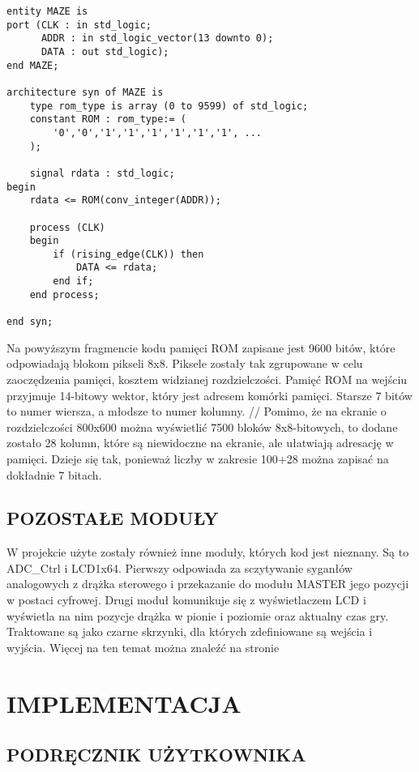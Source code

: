 \documentclass[11pt]{article}
\begin{document}
\begin{lstlisting}
entity MAZE is
port (CLK : in std_logic;
      ADDR : in std_logic_vector(13 downto 0);
      DATA : out std_logic);
end MAZE;

architecture syn of MAZE is
    type rom_type is array (0 to 9599) of std_logic;
    constant ROM : rom_type:= (
        '0','0','1','1','1','1','1','1', ...
    );

    signal rdata : std_logic;
begin
    rdata <= ROM(conv_integer(ADDR));

    process (CLK)
    begin
        if (rising_edge(CLK)) then
            DATA <= rdata;
        end if;
    end process;

end syn;
\end{lstlisting}

Na powyższym fragmencie kodu pamięci ROM zapisane jest 9600 bitów, które odpowiadają blokom pikseli 8x8.
Piksele zostały tak zgrupowane w celu zaoczędzenia pamięci, kosztem widzianej rozdzielczości.
Pamięć ROM na wejściu przyjmuje 14-bitowy wektor, który jest adresem komórki pamięci.
Starsze 7 bitów to numer wiersza, a młodsze to numer kolumny.
//
Pomimo, że na ekranie o rozdzielczości 800x600 można wyświetlić 7500 bloków 8x8-bitowych, to dodane zostało 28 kolumn, które są niewidoczne na ekranie, ale ułatwiają adresację w pamięci.
Dzieje się tak, ponieważ liczby w zakresie 100+28 można zapisać na dokładnie 7 bitach.

\subsection{POZOSTAŁE MODUŁY}

W projekcie użyte zostały również inne moduły, których kod jest nieznany.
Są to ADC\_Ctrl i LCD1x64.
Pierwszy odpowiada za sczytywanie syganłów analogowych z drążka sterowego i przekazanie do modułu MASTER jego pozycji w postaci cyfrowej.
Drugi moduł komunikuje się z wyświetlaczem LCD i wyświetla na nim pozycje drążka w pionie i poziomie oraz aktualny czas gry.
Traktowane są jako czarne skrzynki, dla których zdefiniowane są wejścia i wyjścia.
Więcej na ten temat można znaleźć na stronie 


\section{IMPLEMENTACJA}

\subsection{PODRĘCZNIK UŻYTKOWNIKA}
\end{document}
